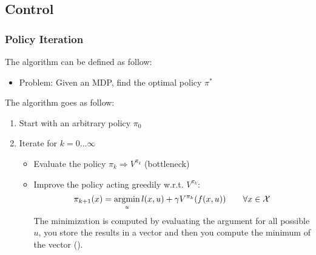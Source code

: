 \subsection{Control}
\subsubsection{Policy Iteration}
The  algorithm can be defined as follow:
\begin{itemize}
\item Problem: Given an MDP, find the optimal policy $\pi^*$
\end{itemize}

The algorithm goes as follow:
\begin{enumerate}
\item Start with an arbitrary policy $\pi_0$
\item Iterate for $k = 0...\infty$ 
\begin{itemize}
\item Evaluate the policy $\pi_k \Rightarrow V^{\pi_k}$ (bottleneck)
\item Improve the policy acting greedily w.r.t. $V^{\pi_k}$:
\[\pi_{k+1}(x) = \operatorname*{argmin}_{u} l(x,u) + \gamma V^{\pi_k}(f(x,u))\qquad \forall x \in \mathcal{X}\]
The minimization is computed by evaluating the argument for all possible $u$, you store the results in a vector and then you compute the minimum of the vector (). 
\end{itemize}
\end{enumerate}

